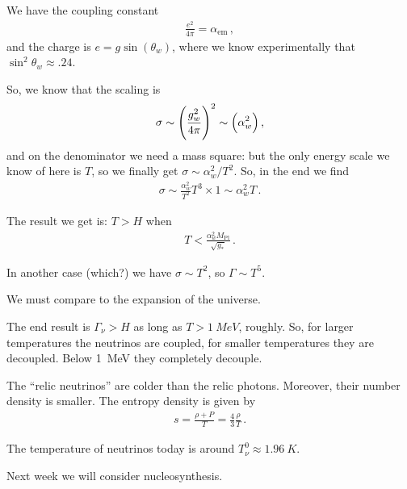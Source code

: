 \documentclass[main.tex]{subfiles}
\begin{document}
We have the coupling constant 
%
\begin{align}
\frac{e^2}{4 \pi } = \alpha _{\text{em}}
\,,
\end{align}
%
and the charge is \(e = g \sin(\theta_{w})\), where we know experimentally that \(\sin^2\theta_{w} \approx \num{.24}\).

So, we know that the scaling is 
%
\begin{align}
\sigma \sim \qty( \frac{g^2_{w}}{4 \pi })^{2}
\sim \qty(\alpha^2_{w})
\,,
\end{align}
%
and on the denominator we need a mass square: but the only energy scale we know of here is \(T\), so we finally get \(\sigma \sim \alpha^2_{w} / T^2\). So, in the end we find 
%
\begin{align}
\sigma \sim \frac{\alpha^2_{w}}{T^2} T^3 \times 1 \sim \alpha^2_{w} T
\,.
\end{align}

The result we get is: \(T > H\) when 
%
\begin{align}
T < \frac{\alpha^2_{w }M _{\text{Pl}}}{\sqrt{g_{*}}}
\,.
\end{align}

In another case (which?) we have \(\sigma \sim T^{2}\), so \(\Gamma \sim T^{5}\). 

We must compare to the expansion of the universe. 

The end result is \(\Gamma_{\nu } > H\) as long as \(T > \SI{1}{MeV}\), roughly. So, for larger temperatures the neutrinos are coupled, for smaller temperatures they are decoupled. Below \SI{1}{MeV} they completely decouple. 

The ``relic neutrinos'' are colder than the relic photons. Moreover, their number density is smaller. 
The entropy density is given by 
%
\begin{align}
s = \frac{\rho + P}{T} = \frac{4}{3} \frac{\rho}{T}
\,.
\end{align}

The temperature of neutrinos today is around \(T^{0}_{\nu } \approx \SI{1.96}{K}\). 

Next week we will consider nucleosynthesis. 
\end{document}
